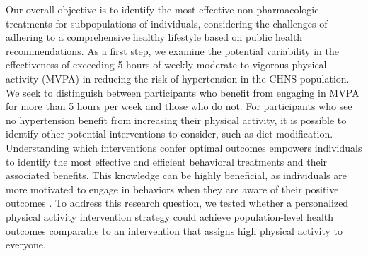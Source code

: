 \documentclass{article}
\begin{document}
Our overall objective is to identify the most effective non-pharmacologic treatments for subpopulations of individuals, considering the challenges of adhering to a comprehensive healthy lifestyle based on public health recommendations. As a first step, we examine the potential variability in the effectiveness of exceeding 5 hours of weekly moderate-to-vigorous physical activity (MVPA) in reducing the risk of hypertension in the CHNS population. We seek to distinguish between participants who benefit from engaging in MVPA for more than 5 hours per week and those who do not. For participants who see no hypertension benefit from increasing their physical activity, it is possible to identify other potential interventions to consider, such as diet modification. Understanding which interventions confer optimal outcomes empowers individuals to identify the most effective and efficient behavioral treatments and their associated benefits. This knowledge can be highly beneficial, as individuals are more motivated to engage in behaviors when they are aware of their positive outcomes \cite{cane2012validation}. To address this research question, we tested whether a personalized physical activity intervention strategy could achieve population-level health outcomes comparable to an intervention that assigns high physical activity to everyone.
 
\end{document}

